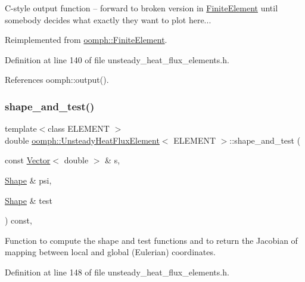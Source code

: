 C-\/style output function -- forward to broken version in \hyperlink{classoomph_1_1FiniteElement}{Finite\+Element} until somebody decides what exactly they want to plot here... 



Reimplemented from \hyperlink{classoomph_1_1FiniteElement_adfaee690bb0608f03320eeb9d110d48c}{oomph\+::\+Finite\+Element}.



Definition at line 140 of file unsteady\+\_\+heat\+\_\+flux\+\_\+elements.\+h.



References oomph\+::output().

\mbox{\label{classoomph_1_1UnsteadyHeatFluxElement_a0dc6fd954b29201949c26582d10c541c}} 
\subsubsection{\texorpdfstring{shape\+\_\+and\+\_\+test()}{shape\_and\_test()}}
{\footnotesize\ttfamily template$<$class E\+L\+E\+M\+E\+NT $>$ \\
double \hyperlink{classoomph_1_1UnsteadyHeatFluxElement}{oomph\+::\+Unsteady\+Heat\+Flux\+Element}$<$ E\+L\+E\+M\+E\+NT $>$\+::shape\+\_\+and\+\_\+test (\begin{DoxyParamCaption}\item[{const \hyperlink{classoomph_1_1Vector}{Vector}$<$ double $>$ \&}]{s,  }\item[{\hyperlink{classoomph_1_1Shape}{Shape} \&}]{psi,  }\item[{\hyperlink{classoomph_1_1Shape}{Shape} \&}]{test }\end{DoxyParamCaption}) const\hspace{0.3cm}{\ttfamily [inline]}, {\ttfamily [protected]}}



Function to compute the shape and test functions and to return the Jacobian of mapping between local and global (Eulerian) coordinates. 



Definition at line 148 of file unsteady\+\_\+heat\+\_\+flux\+\_\+elements.\+h.



